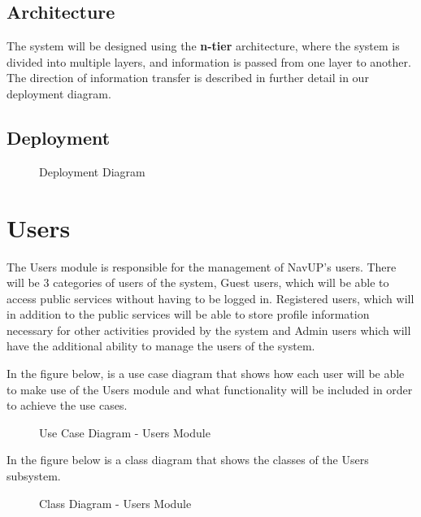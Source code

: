 \documentclass[english]{article}
\begin{document}
        \subsection{Architecture}
	    The system will be designed using the \textbf{n-tier} architecture, where the system is divided into multiple layers, and information is passed from one layer to another. The direction of information transfer is described in further detail in our deployment diagram.

	   \subsection{Deployment}
	        \begin{figure}[H]
            \centering	            
            \centerline{}
            \caption{Deployment Diagram}
        \end{figure}

	\newpage
	\section{Users}
		The Users module is responsible for the management of NavUP's users. There will be 3 categories of users of the system, Guest users, which will be able to access public services without having to be logged in. Registered users, which will in addition to the public services will be able to store profile information necessary for other activities provided by the system and Admin users which will have the additional ability to manage the users of the system.
		
		In the figure below, is a use case diagram that shows how each user will be able to make use of the Users module and what functionality will be included in order to achieve the use cases.
		\begin{figure}[H]
            \centering	            \centerline{}
            \caption{Use Case Diagram - Users Module}
        \end{figure}
		
		In the figure below is a class diagram that shows the classes of the Users subsystem.
	    \begin{figure}[H]
            \centering	            \centerline{}
            \caption{Class Diagram - Users Module}
        \end{figure}
        
\end{document}
